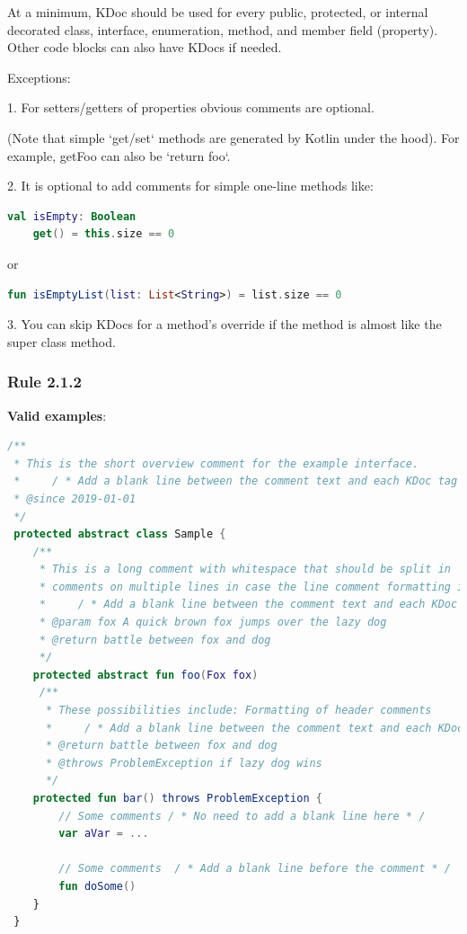 At a minimum, KDoc should be used for every public, protected, or internal decorated class, interface, enumeration, method, and member field (property). Other code blocks can also have KDocs if needed.



Exceptions:



1. For setters/getters of properties obvious comments are optional.

 (Note that simple `get/set` methods are generated by Kotlin under the hood). For example, getFoo can also be `return foo`.

   

2. It is optional to add comments for simple one-line methods like:

\begin{lstlisting}[language=Kotlin]
val isEmpty: Boolean
    get() = this.size == 0
\end{lstlisting}


or



\begin{lstlisting}[language=Kotlin]
fun isEmptyList(list: List<String>) = list.size == 0
\end{lstlisting}


3. You can skip KDocs for a method's override if the method is almost like the super class method.



\subsubsection*{\textbf{Rule 2.1.2}}
\leavevmode\newline



\textbf{Valid examples}:



\begin{lstlisting}[language=Kotlin]
/** 
 * This is the short overview comment for the example interface.
 *     / * Add a blank line between the comment text and each KDoc tag underneath * /
 * @since 2019-01-01
 */
 protected abstract class Sample {
    /**
     * This is a long comment with whitespace that should be split in 
     * comments on multiple lines in case the line comment formatting is enabled.
     *     / * Add a blank line between the comment text and each KDoc tag underneath * /
     * @param fox A quick brown fox jumps over the lazy dog
     * @return battle between fox and dog 
     */
    protected abstract fun foo(Fox fox)
     /**
      * These possibilities include: Formatting of header comments
      *     / * Add a blank line between the comment text and each KDoc tag underneath * /
      * @return battle between fox and dog
      * @throws ProblemException if lazy dog wins
      */
    protected fun bar() throws ProblemException {
        // Some comments / * No need to add a blank line here * /   
        var aVar = ...

        // Some comments  / * Add a blank line before the comment * /   
        fun doSome()
    }
 }
\end{lstlisting}


